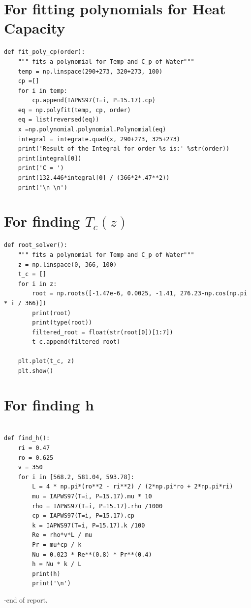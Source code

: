 \documentclass[12pt,letterpaper]{article}
\begin{document}
\begin{appendices}

\section{For fitting polynomials for Heat Capacity}

\begin{verbatim}
def fit_poly_cp(order):
    """ fits a polynomial for Temp and C_p of Water"""
    temp = np.linspace(290+273, 320+273, 100)
    cp =[]
    for i in temp:
        cp.append(IAPWS97(T=i, P=15.17).cp)
    eq = np.polyfit(temp, cp, order)
    eq = list(reversed(eq))
    x =np.polynomial.polynomial.Polynomial(eq)
    integral = integrate.quad(x, 290+273, 325+273)
    print('Result of the Integral for order %s is:' %str(order))
    print(integral[0])
    print('C = ')
    print(132.446*integral[0] / (366*2*.47**2))
    print('\n \n')
\end{verbatim}

\section{For finding $T_c(z)$}

\begin{verbatim}
def root_solver():
    """ fits a polynomial for Temp and C_p of Water"""
    z = np.linspace(0, 366, 100)
    t_c = []
    for i in z:
        root = np.roots([-1.47e-6, 0.0025, -1.41, 276.23-np.cos(np.pi * i / 366)])
        print(root)
        print(type(root))
        filtered_root = float(str(root[0])[1:7])
        t_c.append(filtered_root)

    plt.plot(t_c, z)
    plt.show()
\end{verbatim}

\section{For finding h}

\begin{verbatim}

def find_h():
    ri = 0.47
    ro = 0.625
    v = 350
    for i in [568.2, 581.04, 593.78]:
        L = 4 * np.pi*(ro**2 - ri**2) / (2*np.pi*ro + 2*np.pi*ri)
        mu = IAPWS97(T=i, P=15.17).mu * 10
        rho = IAPWS97(T=i, P=15.17).rho /1000
        cp = IAPWS97(T=i, P=15.17).cp
        k = IAPWS97(T=i, P=15.17).k /100
        Re = rho*v*L / mu
        Pr = mu*cp / k
        Nu = 0.023 * Re**(0.8) * Pr**(0.4)
        h = Nu * k / L
        print(h)
        print('\n')
\end{verbatim}


\end{appendices}
\pagebreak

-end of report.
\end{document}
